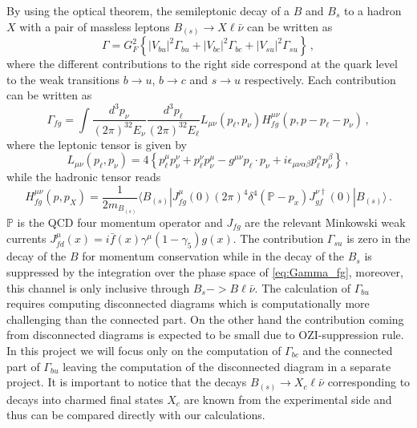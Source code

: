 By using the optical theorem, the semileptonic decay of a $B$ and $B_s$
to a hadron $X$ with a pair of massless leptons $B_{(s)} \to X\ell\bar\nu$ can be written as
\begin{equation}
  \Gamma = G^2_F\left\{ |V_{bu} |^2 \Gamma_{bu} + |V_{bc} |^2 \Gamma_{bc} + |V_{su} |^2 \Gamma_{su}
  \right\}\,,
\end{equation}
where the different contributions to the right side correspond at the quark level
to the weak transitions $b \to u$, $b \to c$ and $s \to u$ respectively.
Each contribution can be written as
\begin{equation}\label{eq:Gamma_fg}
  \Gamma_{fg}=\int \frac{d^3p_\nu}{(2\pi)^32E_\nu}\frac{d^3p_\ell}{(2\pi)^32E_\ell}
  L_{\mu\nu}(p_\ell, p_\nu) H^{\mu\nu}_{fg}(p,p-p_\ell-p_\nu)\,,
\end{equation}
where the leptonic tensor is given by
\begin{equation}
  L_{\mu\nu}(p_\ell, p_\nu) =4\left\{p_\ell^\mu p_\nu^\nu +p_\ell^\nu
  p_\nu^\mu - g^{\mu\nu} p_\ell\cdot p_\nu+
  i\epsilon_{\mu\nu\alpha\beta} p_\ell^\alpha p_\nu^\beta\right\}\,,
\end{equation}
while the hadronic tensor reads
\begin{equation}
  H^{\mu\nu}_{fg}(p,p_X)=\frac{1}{2m_{B_{(s)}}}\langle B_{(s)}| J^\mu_{fg}(0)(2\pi)^4
  \delta^4(\mathbb{P}-p_x) J^{\nu\dagger}_{gf} (0)| B_{(s)}\rangle\,.
\end{equation}
$\mathbb{P}$ is the QCD four momentum operator and $J_{fg}$ are the
relevant Minkowski weak currents $J_{fd}^\mu(x)=i\bar
  f(x)\gamma^\mu(1-\gamma_5)g(x)$.
The contribution $\Gamma_{su}$ is zero in the decay of the $B$ for momentum conservation while  in the decay of the $B_{s}$
is suppressed by the integration over
the phase space of \eqref{eq:Gamma_fg}, moreover, this  channel is only inclusive through $B_s-> B\ell\bar\nu$.
The calculation of $\Gamma_{bu}$  requires computing disconnected diagrams which is computationally more challenging than the connected part.
On the other hand the contribution coming from disconnected diagrams is expected to be small due to OZI-suppression rule.
In this project we will focus only on the computation of $\Gamma_{bc}$ and the connected part of $\Gamma_{bu}$
leaving the computation of the disconnected diagram in a separate project.
It is important to notice that the decays $B_{(s)} \to X_c\ell\bar\nu$ corresponding to decays into charmed final states $X_c$ are known from the experimental side and thus can be compared directly with our calculations.

